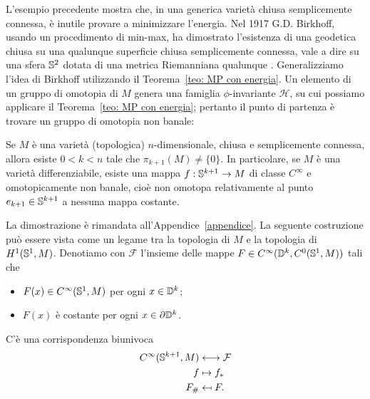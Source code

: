 L'esempio precedente mostra che, in una generica varietà chiusa semplicemente connessa, è inutile provare a minimizzare l'energia. Nel 1917 G.D. Birkhoff, usando un procedimento di min-max, ha dimostrato l'esistenza di una geodetica chiusa su una qualunque superficie chiusa semplicemente connessa, vale a dire su una sfera \(\mathbb{S}^2\) dotata di una metrica Riemanniana qualunque \cite{birkhoff1917dynamical}.
Generalizziamo l'idea di Birkhoff utilizzando il Teorema~\ref{teo: MP con energia}. Un elemento di un gruppo di omotopia di \(M\) genera una famiglia \(\phi\)-invariante \(\mathcal{H}\), su cui possiamo applicare il Teorema~\ref{teo: MP con energia}; pertanto il punto di partenza è trovare un gruppo di omotopia non banale:
\begin{prop*A}
	Se \(M\) è una varietà (topologica) \(n\)-dimensionale, chiusa e semplicemente connessa, allora esiste \(0<k < n\) tale che \(\pi_{k+1}(M) \not = \{0\}\). In particolare, se \(M\) è una varietà differenziabile, esiste una mappa \(f:\mathbb{S}^{k+1} \to M\) di classe \(C^\infty\) e omotopicamente non banale, cioè non omotopa relativamente al punto \(e_{k+1} \in \mathbb{S}^{k+1}\) a nessuna mappa costante. 
\end{prop*A}
La dimostrazione è rimandata all'Appendice~\ref{appendice}.
La seguente costruzione può essere vista come un legame tra la topologia di \(M\) e la topologia di \(H^1(\mathbb{S}^1,M)\). Denotiamo con $\mathcal{F}$ l'insieme delle mappe \(F \in C^\infty(\mathbb{D}^k, C^0(\mathbb{S}^1,M))\) tali che
\begin{itemize}
	\item \(F(x) \in C^\infty(\mathbb{S}^1,M)\) per ogni \(x \in \mathbb{D}^k\);
	\item \(F(x)\) è costante per ogni \(x \in \partial \mathbb{D}^k\).
\end{itemize}

\begin{lemma}\label{lemma: corrispondenza f e F}
	C'è una corrispondenza biunivoca
	\begin{align*}
		C^\infty(\Sp^{k+1},M) &\longleftrightarrow \mathcal{F}\\
		f  & \mapsto f_*\\
		F_\# & \mapsfrom  F .
	\end{align*}
\end{lemma}

